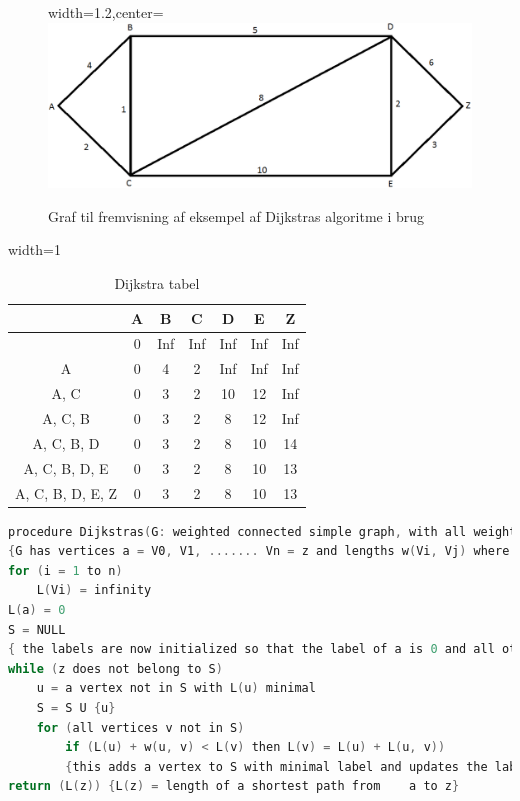 \begin{figure}[H]
\begin{adjustbox}{width=1.2\textwidth,center=\textwidth}
\centering
\includegraphics[width=1.2\textwidth]{Pictures/Teoriafsnit/Figurfiler/dijkstrasgraf.png}
\end{adjustbox}
\caption{Graf til fremvisning af eksempel af Dijkstras algoritme i brug}
\label{fig:dijkstrasgraf}
\end{figure}

\begin{table}[H]
\centering
\begin{adjustbox}{width=1\textwidth}
\Large
\begin{tabular}{| c | c | c | c | c | c | c |}
	\hline
	 & A & B & C & D & E & Z \\
	\hline
	 & 0 & Inf & Inf & Inf & Inf & Inf \\
	\hline
	{A} & 0 & 4 & 2 & Inf & Inf & Inf \\
	\hline
	{A, C} & 0 & 3 & 2 & 10 & 12 & Inf \\
	\hline
	{A, C, B} & 0 & 3 & 2 & 8 & 12 & Inf \\
	\hline
	{A, C, B, D} & 0 & 3 & 2 & 8 & 10 & 14 \\
	\hline
	{A, C, B, D, E} & 0 & 3 & 2 & 8 & 10 & 13 \\
	\hline
	{A, C, B, D, E, Z} & 0 & 3 & 2 & 8 & 10 & 13 \\
	\hline
\end{tabular}
\end{adjustbox}
\caption{Dijkstra tabel}\label{fig:dijkstratabel}
\end{table}

\begin{lstlisting}[language=C,caption={Dijkstras angivet som eksempel i pseudo-kode},label={lst:DijsktrasPseudo1}]
	procedure Dijkstras(G: weighted connected simple graph, with all weights positive)
{G has vertices a = V0, V1, ....... Vn = z and lengths w(Vi, Vj) where w(Vi,Vj) = infinity if{Vi, Vj} is not an edge in G}
for (i = 1 to n)
	L(Vi) = infinity
L(a) = 0
S = NULL
{ the labels are now initialized so that the label of a is 0 and all other labels are infinity, and S is the empty set }
while (z does not belong to S)
	u = a vertex not in S with L(u) minimal
	S = S U {u}
	for (all vertices v not in S)
		if (L(u) + w(u, v) < L(v) then L(v) = L(u) + L(u, v))
		{this adds a vertex to S with minimal label and updates the labels of vertices not in S}
return (L(z)) {L(z) = length of a shortest path from 	a to z}
\end{lstlisting}



